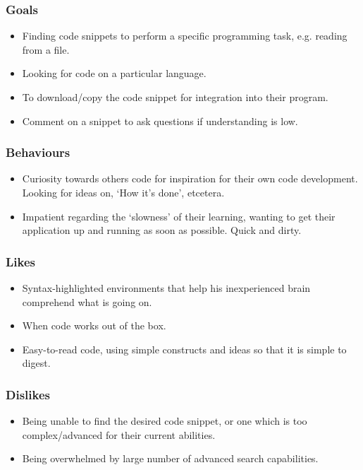 \documentclass[11pt,a4paper]{article}
\begin{document}
\subsubsection{Goals}

\begin{itemize}
\item Finding code snippets to perform a specific programming task,
e.g. reading from a file.
\item Looking for code on a particular language.
\item To download/copy the code snippet for integration into their
program.
\item Comment on a snippet to ask questions if understanding is low.
\end{itemize}

\subsubsection{Behaviours}

\begin{itemize}
\item Curiosity towards others code for inspiration for their own code
development. Looking for ideas on, `How it's done', etcetera.
\item Impatient regarding the `slowness' of their learning, wanting to
get their application up and running as soon as possible. Quick and
dirty.
\end{itemize}

\subsubsection{Likes}

\begin{itemize}
\item Syntax-highlighted environments that help his inexperienced brain
comprehend what is going on.
\item When code works out of the box.
\item Easy-to-read code, using simple constructs and ideas so that it
is simple to digest.
\end{itemize}

\subsubsection{Dislikes}

\begin{itemize}
\item Being unable to find the desired code snippet, or one which is
too complex/advanced for their current abilities.
\item Being overwhelmed by large number of advanced search capabilities.
\end{itemize}
\end{document}
